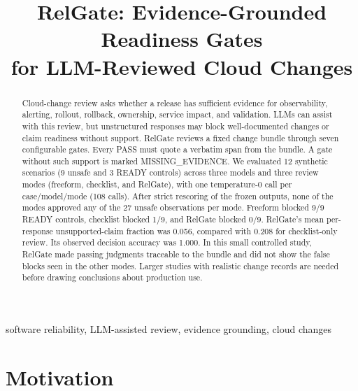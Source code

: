 \documentclass[conference]{IEEEtran}
\begin{document}
\title{RelGate: Evidence-Grounded Readiness Gates\\for LLM-Reviewed Cloud Changes}

\author{
}

\maketitle

\begingroup
\renewcommand{\thefootnote}{}
\endgroup

\begin{abstract}
Cloud-change review asks whether a release has sufficient evidence for observability, alerting, rollout, rollback, ownership, service impact, and validation.
LLMs can assist with this review, but unstructured responses may block well-documented changes or claim readiness without support.
RelGate reviews a fixed change bundle through seven configurable gates.
Every PASS must quote a verbatim span from the bundle. A gate without such support is marked MISSING\_EVIDENCE.
We evaluated 12 synthetic scenarios (9 unsafe and 3 READY controls) across three models and three review modes (freeform, checklist, and RelGate), with one temperature-0 call per case/model/mode (108 calls).
After strict rescoring of the frozen outputs, none of the modes approved any of the 27 unsafe observations per mode.
Freeform blocked 9/9 READY controls, checklist blocked 1/9, and RelGate blocked 0/9.
RelGate's mean per-response unsupported-claim fraction was 0.056, compared with 0.208 for checklist-only review. Its observed decision accuracy was 1.000.
In this small controlled study, RelGate made passing judgments traceable to the bundle and did not show the false blocks seen in the other modes.
Larger studies with realistic change records are needed before drawing conclusions about production use.
\end{abstract}

\begin{IEEEkeywords}
software reliability, LLM-assisted review, evidence grounding, cloud changes
\end{IEEEkeywords}

\section{Motivation}
\end{document}
